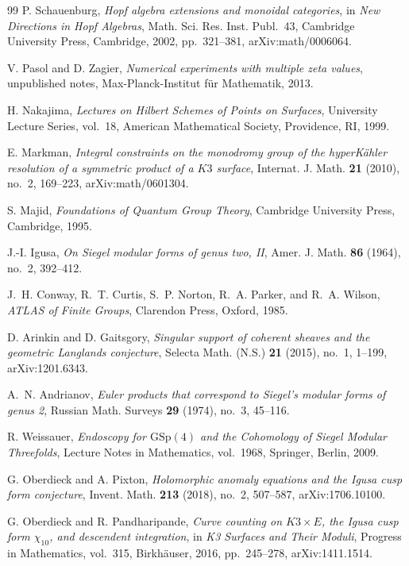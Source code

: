 \begin{thebibliography}{99}
P. Schauenburg, \emph{Hopf algebra extensions and monoidal categories}, in \emph{New Directions in Hopf Algebras}, Math. Sci. Res. Inst. Publ.~43, Cambridge University Press, Cambridge, 2002, pp.~321--381, arXiv:math/0006064.

V. Pasol and D. Zagier, \emph{Numerical experiments with multiple zeta values}, unpublished notes, Max-Planck-Institut f\"ur Mathematik, 2013.

H. Nakajima, \emph{Lectures on Hilbert Schemes of Points on Surfaces}, University Lecture Series, vol.~18, American Mathematical Society, Providence, RI, 1999.

E. Markman, \emph{Integral constraints on the monodromy group of the hyperK\"ahler resolution of a symmetric product of a $K3$ surface}, Internat. J. Math. \textbf{21} (2010), no.~2, 169--223, arXiv:math/0601304.

S. Majid, \emph{Foundations of Quantum Group Theory}, Cambridge University Press, Cambridge, 1995.

J.-I. Igusa, \emph{On Siegel modular forms of genus two, II}, Amer. J. Math. \textbf{86} (1964), no.~2, 392--412.

J.~H. Conway, R.~T. Curtis, S.~P. Norton, R.~A. Parker, and R.~A. Wilson, \emph{ATLAS of Finite Groups}, Clarendon Press, Oxford, 1985.

D. Arinkin and D. Gaitsgory, \emph{Singular support of coherent sheaves and the geometric Langlands conjecture}, Selecta Math. (N.S.) \textbf{21} (2015), no.~1, 1--199, arXiv:1201.6343.

A.~N. Andrianov, \emph{Euler products that correspond to Siegel's modular forms of genus 2}, Russian Math. Surveys \textbf{29} (1974), no.~3, 45--116.

R. Weissauer, \emph{Endoscopy for $\mathrm{GSp}(4)$ and the Cohomology of Siegel Modular Threefolds}, Lecture Notes in Mathematics, vol.~1968, Springer, Berlin, 2009.

G. Oberdieck and A. Pixton, \emph{Holomorphic anomaly equations and the Igusa cusp form conjecture}, Invent. Math. \textbf{213} (2018), no.~2, 507--587, arXiv:1706.10100.

G. Oberdieck and R. Pandharipande, \emph{Curve counting on $K3 \times E$, the Igusa cusp form $\chi_{10}$, and descendent integration}, in \emph{K3 Surfaces and Their Moduli}, Progress in Mathematics, vol.~315, Birkh\"auser, 2016, pp.~245--278, arXiv:1411.1514.


\end{thebibliography}
